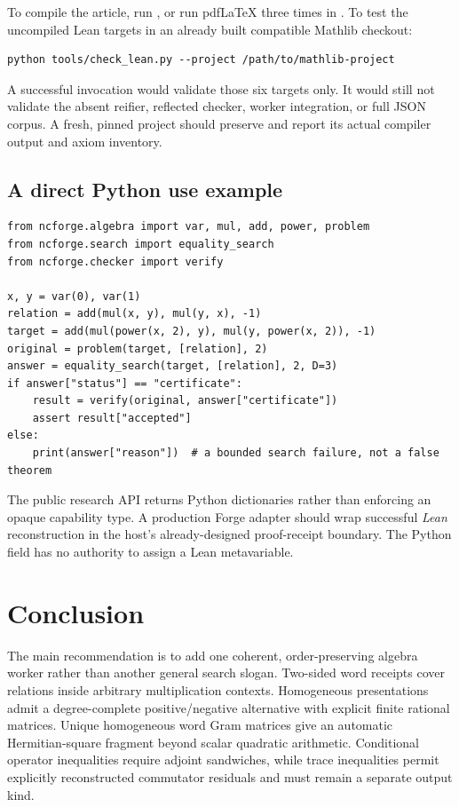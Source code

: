 To compile the article, run , or run pdfLaTeX
three times in . To test the uncompiled Lean targets in an
already built compatible Mathlib checkout:
\begin{lstlisting}
python tools/check_lean.py --project /path/to/mathlib-project
\end{lstlisting}
A successful invocation would validate those six targets only. It would still
not validate the absent reifier, reflected checker, worker integration, or full
JSON corpus. A fresh, pinned project should preserve and report its actual
compiler output and axiom inventory.

\subsection{A direct Python use example}

\begin{lstlisting}
from ncforge.algebra import var, mul, add, power, problem
from ncforge.search import equality_search
from ncforge.checker import verify

x, y = var(0), var(1)
relation = add(mul(x, y), mul(y, x), -1)
target = add(mul(power(x, 2), y), mul(y, power(x, 2)), -1)
original = problem(target, [relation], 2)
answer = equality_search(target, [relation], 2, D=3)
if answer["status"] == "certificate":
    result = verify(original, answer["certificate"])
    assert result["accepted"]
else:
    print(answer["reason"])  # a bounded search failure, not a false theorem
\end{lstlisting}

The public research API returns Python dictionaries rather than enforcing an
opaque capability type. A production Forge adapter should wrap successful
\emph{Lean} reconstruction in the host's already-designed proof-receipt
boundary. The Python  field has no authority to assign a Lean
metavariable.

\section{Conclusion}

The main recommendation is to add one coherent, order-preserving algebra worker
rather than another general search slogan. Two-sided word receipts cover
relations inside arbitrary multiplication contexts. Homogeneous presentations
admit a degree-complete positive/negative alternative with explicit finite
rational matrices. Unique homogeneous word Gram matrices give an automatic
Hermitian-square fragment beyond scalar quadratic arithmetic. Conditional
operator inequalities require adjoint sandwiches, while trace inequalities
permit explicitly reconstructed commutator residuals and must remain a separate
output kind.

